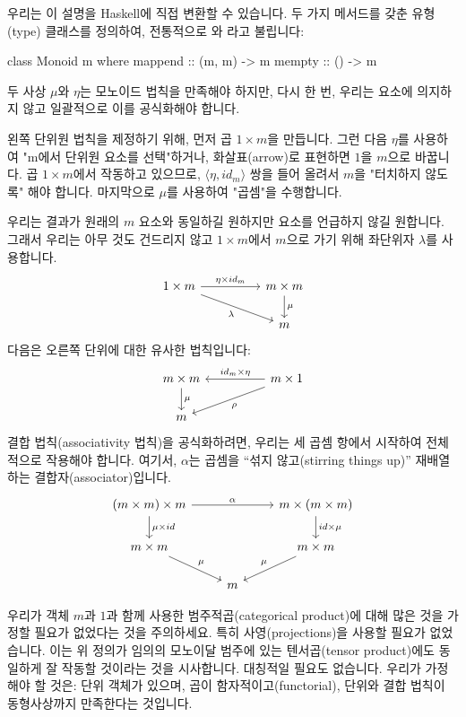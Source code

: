 \documentclass[DaoFP]{subfiles}
\begin{document}
우리는 이 설명을 Haskell에 직접 변환할 수 있습니다. 두 가지 메서드를 갖춘 유형(type) 클래스를 정의하여, 전통적으로 와 라고 불립니다:
\begin{haskell}
class Monoid m where
  mappend :: (m, m) -> m
  mempty  :: () -> m
\end{haskell}

두 사상 $\mu$와 $\eta$는 모노이드 법칙을 만족해야 하지만, 다시 한 번, 우리는 요소에 의지하지 않고 일괄적으로 이를 공식화해야 합니다.

왼쪽 단위원 법칙을 제정하기 위해, 먼저 곱 $1 \times m$을 만듭니다. 그런 다음 $\eta$를 사용하여 "m에서 단위원 요소를 선택"하거나, 화살표(arrow)로 표현하면 $1$을 $m$으로 바꿉니다. 곱 $1 \times m$에서 작동하고 있으므로, $\langle \eta, id_m \rangle$ 쌍을 들어 올려서 $m$을 "터치하지 않도록" 해야 합니다. 마지막으로 $\mu$를 사용하여 "곱셈"을 수행합니다.

우리는 결과가 원래의 $m$ 요소와 동일하길 원하지만 요소를 언급하지 않길 원합니다. 그래서 우리는 아무 것도 건드리지 않고 $1 \times m$에서 $m$으로 가기 위해 좌단위자 $\lambda$를 사용합니다.
\[
 \begin{tikzcd}
 1 \times m
 \arrow[rr, "\eta \times id_m"]
 \arrow[rrd, "\lambda"']
& & m \times m
 \arrow[d, "\mu"]
 \\
 && m
  \end{tikzcd}
\]
다음은 오른쪽 단위에 대한 유사한 법칙입니다:
\[
 \begin{tikzcd}
 m \times m
 \arrow[d, "\mu"]
 && m \times 1
 \arrow[ll, "id_m \times \eta"']
 \arrow[lld, "\rho"]
 \\
 m
 \end{tikzcd}
\]
결합 법칙(associativity 법칙)을 공식화하려면, 우리는 세 곱셈 항에서 시작하여 전체적으로 작용해야 합니다. 여기서, $\alpha$는 곱셈을 ``섞지 않고(stirring things up)'' 재배열하는 결합자(associator)입니다.
\[
 \begin{tikzcd}
 (m \times m) \times m 
 \arrow[rr, "\alpha"]
 \arrow[d, "\mu \times id"]
 &&
 m \times (m \times m)
 \arrow[d, "id \times \mu"]
 \\
 m \times m 
 \arrow[dr, "\mu"]
& & m \times m
 \arrow[dl, "\mu"']
 \\
&  m
 \end{tikzcd}
\]

우리가 객체 $m$과 $1$과 함께 사용한 범주적곱(categorical product)에 대해 많은 것을 가정할 필요가 없었다는 것을 주의하세요. 특히 사영(projections)을 사용할 필요가 없었습니다. 이는 위 정의가 임의의 모노이달 범주에 있는 텐서곱(tensor product)에도 동일하게 잘 작동할 것이라는 것을 시사합니다. 대칭적일 필요도 없습니다. 우리가 가정해야 할 것은: 단위 객체가 있으며, 곱이 함자적이고(functorial), 단위와 결합 법칙이 동형사상까지 만족한다는 것입니다.
\end{document}
